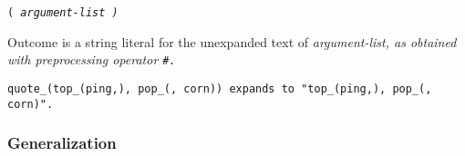 \def\Subsubsection#1{\subsubsection{#1}
}


 \tt{(} \it{argument-list} \tt{)}


Outcome is a string literal for the unexpanded text of \it{argument-list},
as obtained with preprocessing operator \tt{#}.

\example \tt{quote_(top_(ping,), pop_(, corn))}
expands to \tt{"top_(ping,), pop_(, corn)"}.

\Subsubsection{Generalization}
